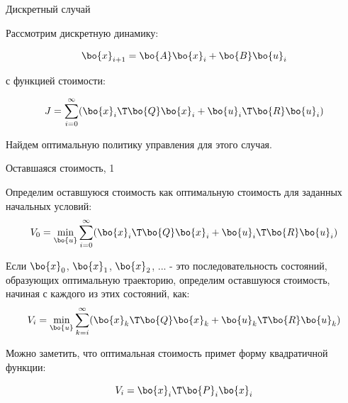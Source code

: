 \documentclass{beamer}
\begin{document}
\begin{frame}{Дискретный случай}
	\begin{flushleft}
		
		Рассмотрим дискретную динамику:
		
		\begin{equation}
			\bo{x}_{i+1} = \bo{A}\bo{x}_i + \bo{B}\bo{u}_i
		\end{equation}
		
		с функцией стоимости:
		
		\begin{equation}
			J = \sum_{i=0}^\infty (\bo{x}_i\T \bo{Q} \bo{x}_i +  \bo{u}_i\T \bo{R} \bo{u}_i)
		\end{equation}
		
		Найдем оптимальную политику управления для этого случая.
		
		
	\end{flushleft}
\end{frame}



\begin{frame}{Оставшаяся стоимость, 1}
	\begin{flushleft}
		
		Определим оставшуюся стоимость как оптимальную стоимость для заданных начальных условий:
		\begin{equation}
			V_0 = \underset{\bo{u}}{\text{min}} \sum_{i=0}^\infty (\bo{x}_i\T \bo{Q} \bo{x}_i +  \bo{u}_i\T \bo{R} \bo{u}_i)
		\end{equation}
		
		Если $\bo{x}_0$, $\bo{x}_1$, $\bo{x}_2$, ... - это последовательность состояний, образующих оптимальную траекторию, определим оставшуюся стоимость, начиная с каждого из этих состояний, как:
		\begin{equation}
			V_i =  \underset{\bo{u}}{\text{min}} \sum_{k = i}^\infty (\bo{x}_k\T \bo{Q} \bo{x}_k +  \bo{u}_k\T \bo{R} \bo{u}_k)
		\end{equation}
		
		Можно заметить, что оптимальная стоимость примет форму квадратичной функции:
		
		\begin{equation}
			V_i = \bo{x}_i\T \bo{P}_i \bo{x}_i
		\end{equation}
		
		
		
	\end{flushleft}
\end{frame}
\end{document}
